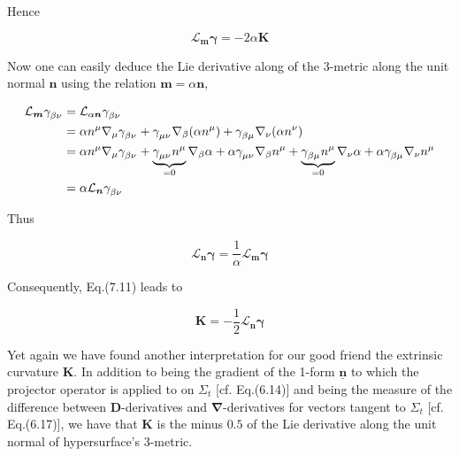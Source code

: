 \documentclass[12pt]{article}
\renewcommand{\vec}[1]{\bm{#1}}
\numberwithin{equation}{section}
\numberwithin{theorem}{subsection}
\begin{document}
Hence 

\begin{equation}

    \boxed{\mathcal{L}_{\vec{m}}\vec{\gamma} = -2\alpha\vec{K}}

\end{equation}

Now one can easily deduce the Lie derivative along of the 3-metric along the unit normal $\vec{n}$ using the relation $\vec{m} = \alpha \vec{n}$,

\begin{align*}

    \mathcal{L}_{\vec{m}} \tensor{\gamma}{_\beta_\nu} &= \mathcal{L}_{\alpha\vec{n}}\tensor{\gamma}{_\beta_\nu} \\ 

    &= \alpha n^{\mu}\nabla_{\mu}\tensor{\gamma}{_\beta_\nu} + \tensor{\gamma}{_\mu_\nu}\nabla_{\beta}(\alpha n^{\mu}) + \tensor{\gamma}{_\beta_\mu}\nabla_{\nu}(\alpha n^{\nu}) \\

    &= \alpha n^{\mu}\nabla_{\mu}\tensor{\gamma}{_\beta_\nu} + \underbrace{\tensor{\gamma}{_\mu_\nu}n^{\mu}}_{= 0}\nabla_{\beta}\alpha + \alpha \tensor{\gamma}{_\mu_\nu}\nabla_{\beta}n^{\mu}+\underbrace{\tensor{\gamma}{_\beta_\mu}n^{\mu}}_{= 0}\nabla_{\nu}\alpha+\alpha\tensor{\gamma}{_\beta_\mu}\nabla_{\nu}n^{\mu} \\ &= \alpha \mathcal{L}_{\vec{n}}\tensor{\gamma}{_\beta_\nu}

\end{align*}

Thus

\begin{equation}

    \mathcal{L}_{\vec{n}}\vec{\gamma} = \frac{1}{\alpha}\mathcal{L}_{\vec{m}}\vec{\gamma}

\end{equation}

Consequently, Eq.(7.11) leads to 

\begin{equation}

    \boxed{\vec{K} = -\frac{1}{2}\mathcal{L}_{\vec{n}}\vec{\gamma}}

\end{equation}

Yet again we have found another interpretation for our good friend the extrinsic curvature $\vec{K}$. In addition to being the gradient of the 1-form $\underline{\vec{n}}$ to which the projector operator is applied to on $\Sigma_{t}$ [cf. Eq.(6.14)] and being the measure of the difference between $\vec{D}$-derivatives and $\vec{\nabla}$-derivatives for vectors tangent to $\Sigma_{t}$ [cf. Eq.(6.17)], we have that $\vec{K}$ is the minus $0.5$ of the Lie derivative along the unit normal of hypersurface's 3-metric.
\end{document}
